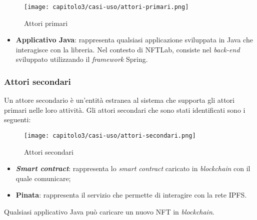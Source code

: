 \begin{figure}[h!]
  \centering
  \texttt{[image: capitolo3/casi-uso/attori-primari.png]}
  \caption{Attori primari}
\end{figure}

\begin{itemize}
  \item \textbf{Applicativo Java}: rappresenta qualsiasi applicazione sviluppata in Java che interagisce con la libreria. Nel contesto di NFTLab, consiste nel \textit{back-end} sviluppato utilizzando il \textit{framework} Spring.
\end{itemize}

\subsubsection{Attori secondari}
Un attore secondario è un'entità estranea al sistema che supporta gli attori primari nelle loro attività. Gli attori secondari che sono stati identificati sono i seguenti:

\clearpage
\begin{figure}[h!]
  \centering
  \texttt{[image: capitolo3/casi-uso/attori-secondari.png]}
  \caption{Attori secondari}
\end{figure}

\begin{itemize}
  \item \textbf{\textit{Smart contract}}: rappresenta lo \textit{smart contract} caricato in \textit{blockchain} con il quale comunicare;
  \item \textbf{Pinata}: rappresenta il servizio che permette di interagire con la rete IPFS.
\end{itemize}

\label{UC:upload-new-nft}

Qualsiasi applicativo Java può caricare un nuovo NFT in \textit{blockchain}.

